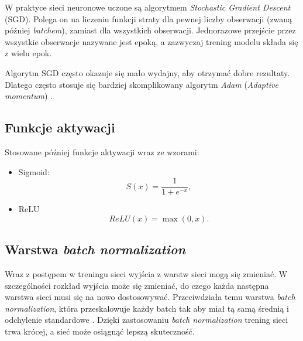\documentclass{pracalicmgr}
\begin{document}
	W praktyce sieci neuronowe uczone są algorytmem \textit{Stochastic Gradient Descent} (SGD). Polega on na liczeniu funkcji straty dla pewnej liczby obserwacji (zwaną później \textit{batchem}), zamiast dla wszystkich obserwacji. Jednorazowe przejście przez wszystkie obserwacje nazywane jest epoką, a zazwyczaj trening modelu składa się z wielu epok.
	
	Algorytm SGD często okazuje się mało wydajny, aby otrzymać dobre rezultaty. Dlatego często stosuje się bardziej skomplikowany algorytm \textit{Adam} (\textit{Adaptive momentum}) \cite{adam}.
	
	\subsection{Funkcje aktywacji}
	Stosowane później funkcje aktywacji wraz ze wzorami:
	\begin{itemize}
	\item Sigmoid: $$S(x) = \frac{1}{1+e^{-x}},$$
	\item ReLU\cite{relu} $$ReLU(x) = \max(0, x).$$
	\end{itemize}
	
	\subsection{Warstwa \textit{batch normalization}}
	Wraz z postępem w treningu sieci wyjścia z warstw sieci mogą się zmieniać. W szczególności rozkład wyjścia może się zmieniać, do czego każda następna warstwa sieci musi się na nowo dostosowywać. Przeciwdziała temu warstwa \textit{batch normalization}, która przeskalowuje każdy batch tak aby miał tą samą średnią i odchylenie standardowe \cite{batch_norm}. Dzięki zastosowaniu \textit{batch normalization} trening sieci trwa krócej, a sieć może osiągnąć lepszą skuteczność.
	
	
	
\end{document}
